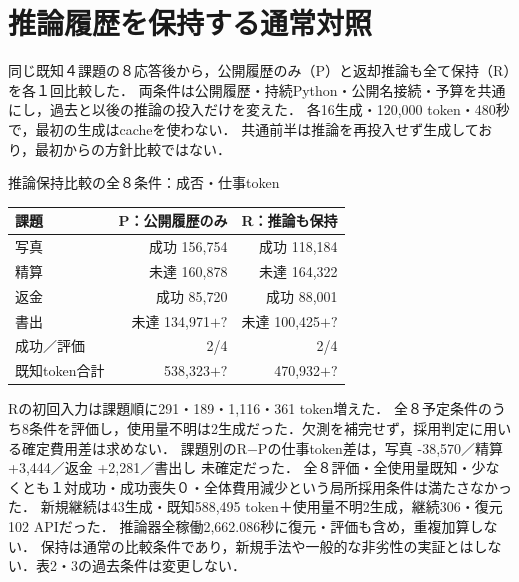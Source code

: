 \section{推論履歴を保持する通常対照}
同じ既知４課題の８応答後から，公開履歴のみ（P）と返却推論も全て保持（R）を各１回比較した．
両条件は公開履歴・持続Python・公開名接続・予算を共通にし，過去と以後の推論の投入だけを変えた．
各16生成・120,000 token・480秒で，最初の生成はcacheを使わない．
共通前半は推論を再投入せず生成しており，最初からの方針比較ではない．
\begin{center}\begin{minipage}{\columnwidth}\centering
\small 推論保持比較の全８条件：成否・仕事token\par\smallskip
\begin{tabular}{lrr}\hline 課題 & P：公開履歴のみ & R：推論も保持\\\hline
写真 & 成功 156,754 & 成功 118,184\\
精算 & 未達 160,878 & 未達 164,322\\
返金 & 成功 85,720 & 成功 88,001\\
書出 & 未達 134,971$+?$ & 未達 100,425$+?$\\
\hline
成功／評価 & 2/4 & 2/4\\
既知token合計 & 538,323$+?$ & 470,932$+?$\\
\hline\end{tabular}
\end{minipage}\end{center}
Rの初回入力は課題順に291・189・1,116・361 token増えた．
全８予定条件のうち8条件を評価し，使用量不明は2生成だった．欠測を補完せず，採用判定に用いる確定費用差は求めない．
課題別のR−Pの仕事token差は，写真 -38,570／精算 +3,444／返金 +2,281／書出し 未確定だった．
全８評価・全使用量既知・少なくとも１対成功・成功喪失０・全体費用減少という局所採用条件は満たさなかった．
新規継続は43生成・既知588,495 token＋使用量不明2生成，継続306・復元102 APIだった．
推論器全稼働2,662.086秒に復元・評価も含め，重複加算しない．
保持は通常の比較条件であり，新規手法や一般的な非劣性の実証とはしない．表2・3の過去条件は変更しない．

